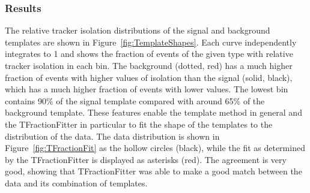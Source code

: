 
\subsubsection{Results}
\label{anMeth:BGSubTemplateResults}


The relative tracker isolation distributions of the 
signal and background templates are shown in 
Figure~\ref{fig:TemplateShapes}.  
Each curve independently integrates to 1
and shows the fraction of events of the given type
with relative tracker isolation in each bin.
The background (dotted, red) has a much higher fraction of events 
with higher values of isolation 
than the signal (solid, black), 
which has a much higher fraction of events 
with lower values.  
The lowest bin contains 90\% of the signal template compared with 
around 65\% of the background template. 
These features enable the template method in general 
and the TFractionFitter in particular 
to fit the shape of the templates to the 
distribution of the data.  
The data distribution is shown in 
Figure~\ref{fig:TFractionFit} 
as the hollow circles (black), 
while the fit as determined by the
TFractionFitter is displayed as asterisks (red).  
The agreement is very good, showing that 
TFractionFitter was able to make a good 
match between the data and its combination 
of templates.  

